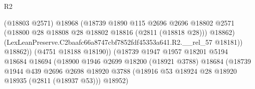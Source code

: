 \begin{lexlean}{R2}
\begin{coremodule}
                                              (@18803 @2571)
                                              @18968
                                              (@18739
                                                @1890
                                                @115
                                                @2696
                                                @2696
                                                @18802
                                                @2571
                                                (@18800
                                                  @28
                                                  @18808
                                                  @28
                                                  @18802
                                                  @18816
                                                  (@2811 (@18818 @28)))
                                                @18862)
                                              (LexLeanPreserve.C2baafc66a8747cbf7852fdf45353a641.R2.__rel_57
                                                @18181))
                                            @18862))
                                        (@4751 @18188 @18190))
                                      (@18739
                                        @1947
                                        @1957
                                        @18201
                                        @5194
                                        @18684
                                        @18694
                                        (@18900
                                          @1946
                                          @2699
                                          @18200
                                          (@18921 @3788)
                                          @18684
                                          (@18739
                                            @1944
                                            @439
                                            @2696
                                            @2698
                                            @18920
                                            @3788
                                            (@18916
                                              @53
                                              @18924
                                              @28
                                              @18920
                                              @18935
                                              (@2811 (@18937 @53)))
                                            @18952)

\end{coremodule}
\end{lexlean}
